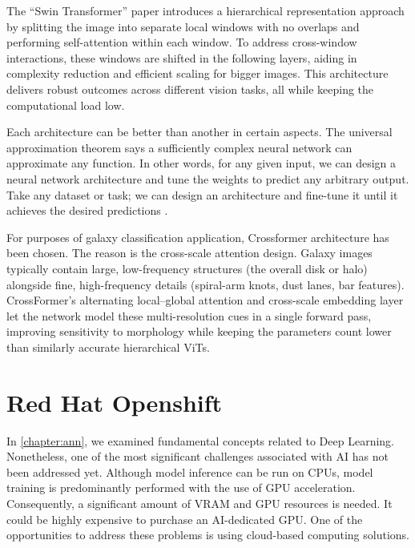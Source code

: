 The \enquote{Swin Transformer} paper introduces a hierarchical representation approach by splitting the image into separate local windows with no overlaps and performing self-attention within each window. To address cross-window interactions, these windows are shifted in the following layers, aiding in complexity reduction and efficient scaling for bigger images. This architecture delivers robust outcomes across different vision tasks, all while keeping the computational load low.

\medskip

Each architecture can be better than another in certain aspects. The universal approximation theorem says a sufficiently complex neural network can approximate any function. In other words, for any given input, we can design a neural network architecture and tune the weights to predict any arbitrary output. Take any dataset or task; we can design an architecture and fine-tune it until it achieves the desired predictions \cite{ayyadevara2024modern}.

\medskip

For purposes of galaxy classification application, Crossformer architecture has been chosen. The reason is the cross-scale attention design. Galaxy images typically contain large, low-frequency structures (the overall disk or halo) alongside fine, high-frequency details (spiral-arm knots, dust lanes, bar features). CrossFormer’s alternating local–global attention and cross-scale embedding layer let the network model these multi-resolution cues in a single forward pass, improving sensitivity to morphology while keeping the parameters count lower than similarly accurate hierarchical ViTs.

\chapter{Red Hat Openshift}

In \autoref{chapter:ann}, we examined fundamental concepts related to Deep Learning. Nonetheless, one of the most significant challenges associated with AI has not been addressed yet. Although model inference can be run on CPUs, model training is predominantly performed with the use of GPU acceleration. Consequently, a significant amount of VRAM and GPU resources is needed. It could be highly expensive to purchase an AI-dedicated GPU. One of the opportunities to address these problems is using cloud-based computing solutions.


